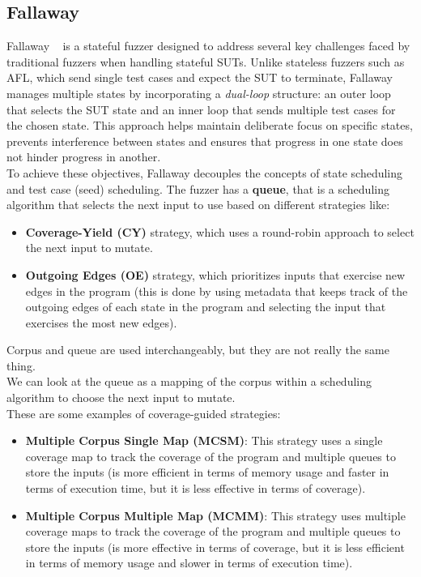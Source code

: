 \subsection{Fallaway}
Fallaway ~\cite{Fallaway} is a stateful fuzzer designed to address several key challenges faced by traditional fuzzers when handling stateful SUTs. Unlike stateless fuzzers such as AFL, which send single test cases and expect the SUT to terminate, Fallaway manages multiple states by incorporating a \textit{dual-loop} structure: an outer loop that selects the SUT state and an inner loop that sends multiple test cases for the chosen state. This approach helps maintain deliberate focus on specific states, prevents interference between states and ensures that progress in one state does not hinder progress in another.
\\To achieve these objectives, Fallaway decouples the concepts of state scheduling and test case (seed) scheduling.
The fuzzer has a \textbf{queue}, that is a scheduling algorithm that selects the next input to use based on different strategies like:
\begin{itemize}
    \item \textbf{Coverage-Yield (CY)} strategy, which uses a round-robin approach to select the next input to mutate.
    \item \textbf{Outgoing Edges (OE)} strategy, which prioritizes inputs that exercise new edges in the program (this is done by using metadata that keeps track of the outgoing edges of each state in the program and selecting the input that exercises the most new edges).
\end{itemize} 
Corpus and queue are used interchangeably, but they are not really the same thing. \\We can look at the queue as a mapping of the corpus within a scheduling algorithm to choose the next input to mutate.
\\These are some examples of coverage-guided strategies:
\begin{itemize}
    \item \textbf{Multiple Corpus Single Map (MCSM)}: This strategy uses a single coverage map to track the coverage of the program and multiple queues to store the inputs (is more efficient in terms of memory usage and faster in terms of execution time, but it is less effective in terms of coverage).
    
    \item \textbf{Multiple Corpus Multiple Map (MCMM)}: This strategy uses multiple coverage maps to track the coverage of the program and multiple queues to store the inputs (is more effective in terms of coverage, but it is less efficient in terms of memory usage and slower in terms of execution time).
\end{itemize}
